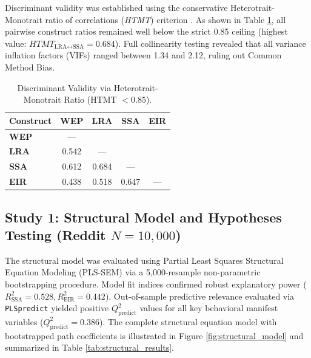 Discriminant validity was established using the conservative Heterotrait-Monotrait ratio of correlations (\textit{HTMT}) criterion \citep{cerulli2026dark}. As shown in Table \ref{tab:htmt_matrix}, all pairwise construct ratios remained well below the strict 0.85 ceiling (highest value: $HTMT_{\text{LRA} \leftrightarrow \text{SSA}} = 0.684$). Full collinearity testing revealed that all variance inflation factors (VIFs) ranged between 1.34 and 2.12, ruling out Common Method Bias.

\begin{table}[htbp]
\centering
\small
\begin{tabular}{lcccc}
\toprule
\textbf{Construct} & \textbf{WEP} & \textbf{LRA} & \textbf{SSA} & \textbf{EIR} \\
\midrule
\textbf{WEP} & --- & & & \\
\textbf{LRA} & 0.542 & --- & & \\
\textbf{SSA} & 0.612 & 0.684 & --- & \\
\textbf{EIR} & 0.438 & 0.518 & 0.647 & --- \\
\bottomrule
\end{tabular}
\caption{Discriminant Validity via Heterotrait-Monotrait Ratio (HTMT $< 0.85$).}
\label{tab:htmt_matrix}
\end{table}

\subsection{Study 1: Structural Model and Hypotheses Testing (Reddit $N = 10,000$)}
The structural model was evaluated using Partial Least Squares Structural Equation Modeling (PLS-SEM) via a 5,000-resample non-parametric bootstrapping procedure. Model fit indices confirmed robust explanatory power ($R^2_{\text{SSA}} = 0.528, R^2_{\text{EIR}} = 0.442$). Out-of-sample predictive relevance evaluated via \texttt{PLSpredict} yielded positive $Q^2_{\text{predict}}$ values for all key behavioral manifest variables ($Q^2_{\text{predict}} = 0.386$). The complete structural equation model with bootstrapped path coefficients is illustrated in Figure \ref{fig:structural_model} and summarized in Table \ref{tab:structural_results}.

